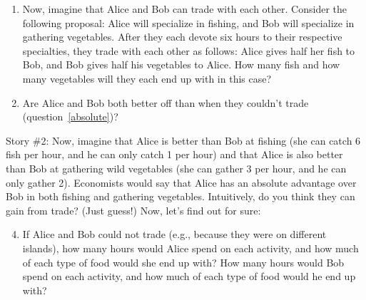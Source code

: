\begin{enumerate}
\begin{enumerate}
    \item Now, imagine that Alice and Bob can trade with each other. Consider the following proposal: Alice will specialize in fishing, and Bob will specialize in gathering vegetables. After they each devote six hours to their respective specialties, they trade with each other as follows: Alice gives half her fish to Bob, and Bob gives half his vegetables to Alice. How many fish and how many vegetables will they each end up with in this case?


    \item Are Alice and Bob both better off than when they couldn't trade (question~\ref{absolute})? %


    \end{enumerate}


Story \#2: Now, imagine that Alice is better than Bob at fishing (she can catch 6 fish per hour, and he can only catch 1 per hour) and that Alice is also better than Bob at gathering wild vegetables (she can gather 3 per hour, and he can only gather 2). Economists would say that Alice has an absolute advantage over Bob in both fishing and gathering vegetables. Intuitively, do you think they can gain from trade?  %
(Just guess!) Now, let's find out for sure:

    \begin{enumerate}

    \setcounter{enumii}{3}

    \item \label{comparative} If Alice and Bob could not trade (e.g., because they were on different islands), how many hours would Alice spend on each activity, and how much of each type of food would she end up with? How many hours would Bob spend on each activity, and how much of each type of food would he end up with? %




\end{enumerate}
\end{enumerate}
